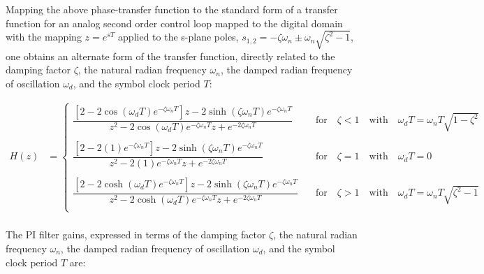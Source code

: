 \documentclass{article}
\begin{document}
Mapping the above phase-transfer function to the standard form of a transfer
function for an analog second order control loop mapped to the digital domain
with the mapping $z = e^{sT}$ applied to the s-plane poles,
$s_{1,2} = -\zeta\omega_{n} \pm \omega_{n}\sqrt{\zeta^{2}-1}$, one obtains an
alternate form of the transfer function, directly related to the damping factor 
$\zeta$, the natural radian frequency $\omega_{n}$, the damped radian frequency
of oscillation $\omega_{d}$, and the symbol clock period $T$:

\begin{align*}
   H(z) &=
      \begin{cases}
         \dfrac{
                [2 -2\cos(\omega_{d}T)e^{-\zeta\omega_{n}T}] z 
                -2\sinh(\zeta\omega_{n}T)e^{-\zeta\omega_{n}T} 
               }
               {
                z^{2}
                - 2 \cos(\omega_{d}T) e^{-\zeta\omega_{n}T} z
                + e^{-2\zeta\omega_{n}T}
               }
               & \quad \text{for} \quad \zeta < 1 \quad \text{with}
               \quad \omega_{d}T = \omega_{n}T \sqrt{1 - \zeta^{2}}
               \\
\\
         \dfrac{
                [2 -2(1)e^{-\zeta\omega_{n}T}] z 
                -2\sinh(\zeta\omega_{n}T)e^{-\zeta\omega_{n}T} 
               }
               {
                z^{2}
                - 2(1)e^{-\zeta\omega_{n}T} z
                + e^{-2\zeta\omega_{n}T}
               }
               & \quad \text{for} \quad \zeta = 1 \quad \text{with}
               \quad \omega_{d}T = 0
               \\
\\
         \dfrac{
                [2 -2\cosh(\omega_{d}T)e^{-\zeta\omega_{n}T}] z 
                -2\sinh(\zeta\omega_{n}T)e^{-\zeta\omega_{n}T} 
               }
               {
                z^{2}
                - 2 \cosh(\omega_{d}T) e^{-\zeta\omega_{n}T} z
                + e^{-2\zeta\omega_{n}T}
               }
               & \quad \text{for} \quad \zeta > 1 \quad \text{with}
               \quad \omega_{d}T = \omega_{n}T \sqrt{\zeta^{2} - 1}
               \\
      \end{cases}
\\
\end{align*}

The PI filter gains, expressed in terms of the damping factor $\zeta$,
the natural radian frequency $\omega_{n}$, the damped radian frequency of
oscillation $\omega_{d}$, and the symbol clock period $T$ are:
\end{document}
